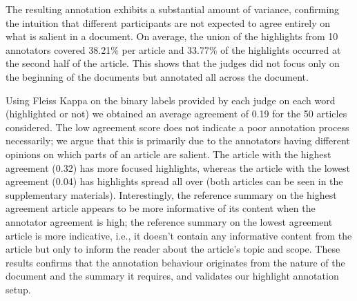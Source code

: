 \documentclass[11pt,a4paper]{article}
\begin{document}
The resulting annotation exhibits a substantial amount of variance, confirming the intuition that different participants are not expected to agree entirely on what is salient in a document. 
On average, the union of the highlights from 10 annotators covered 38.21\% per article and  33.77\% of the highlights occurred at the second half of the article. This shows that the judges did not focus only on the beginning of the documents but annotated all across the document.


Using Fleiss Kappa \citep{Josep1971} on the binary labels provided by each judge on each word (highlighted or not) we obtained an average agreement of 0.19 for the 50 articles considered. The low agreement score does not indicate a poor annotation process necessarily; we argue that this is primarily due to the annotators having different opinions on which parts of an article are salient. The article with the highest agreement (0.32) has more focused highlights, whereas the article with the lowest agreement (0.04) has highlights spread all over (both articles can be seen in the supplementary materials). Interestingly, the reference summary on the highest agreement article appears to be more informative of its content when the annotator agreement is high; the reference summary on the lowest agreement article is more indicative, i.e., it doesn’t contain any informative content from the article but only to inform the reader about the article’s topic and scope. These results confirms that the annotation behaviour originates from the nature of the document and the summary it requires, and validates our highlight annotation setup.

\end{document}
